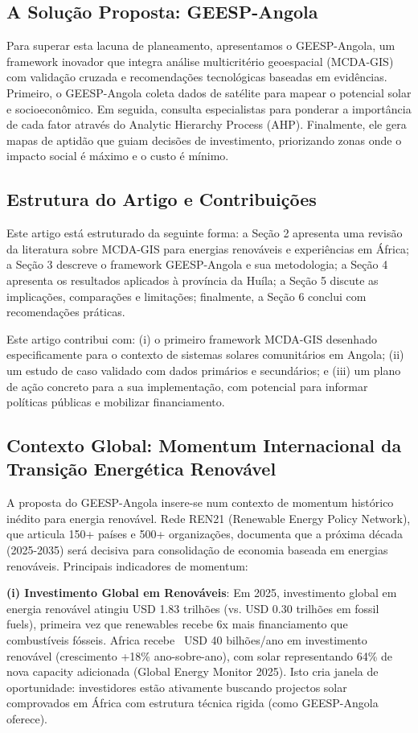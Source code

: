 \documentclass[12pt, a4paper]{article}
\begin{document}
\subsection{A Solução Proposta: GEESP-Angola}
Para superar esta lacuna de planeamento, apresentamos o GEESP-Angola, um framework inovador que integra análise multicritério geoespacial (MCDA-GIS) com validação cruzada e recomendações tecnológicas baseadas em evidências. Primeiro, o GEESP-Angola coleta dados de satélite para mapear o potencial solar e socioeconômico. Em seguida, consulta especialistas para ponderar a importância de cada fator através do Analytic Hierarchy Process (AHP). Finalmente, ele gera mapas de aptidão que guiam decisões de investimento, priorizando zonas onde o impacto social é máximo e o custo é mínimo.

\subsection{Estrutura do Artigo e Contribuições}
Este artigo está estruturado da seguinte forma: a Seção 2 apresenta uma revisão da literatura sobre MCDA-GIS para energias renováveis e experiências em África; a Seção 3 descreve o framework GEESP-Angola e sua metodologia; a Seção 4 apresenta os resultados aplicados à província da Huíla; a Seção 5 discute as implicações, comparações e limitações; finalmente, a Seção 6 conclui com recomendações práticas.

Este artigo contribui com: (i) o primeiro framework MCDA-GIS desenhado especificamente para o contexto de sistemas solares comunitários em Angola; (ii) um estudo de caso validado com dados primários e secundários; e (iii) um plano de ação concreto para a sua implementação, com potencial para informar políticas públicas e mobilizar financiamento.

\subsection{Contexto Global: Momentum Internacional da Transição Energética Renovável}

A proposta do GEESP-Angola insere-se num contexto de momentum histórico inédito para energia renovável. Rede REN21 (Renewable Energy Policy Network), que articula 150+ países e 500+ organizações, documenta que a próxima década (2025-2035) será decisiva para consolidação de economia baseada em energias renováveis. Principais indicadores de momentum:

\textbf{(i) Investimento Global em Renováveis}: Em 2025, investimento global em energia renovável atingiu USD 1.83 trilhões (vs. USD 0.30 trilhões em fossil fuels), primeira vez que renewables recebe 6x mais financiamento que combustíveis fósseis. Africa recebe ~USD 40 bilhões/ano em investimento renovável (crescimento +18\% ano-sobre-ano), com solar representando 64\% de nova capacity adicionada (Global Energy Monitor 2025). Isto cria janela de oportunidade: investidores estão ativamente buscando projectos solar comprovados em África com estrutura técnica rigida (como GEESP-Angola oferece).
\end{document}
